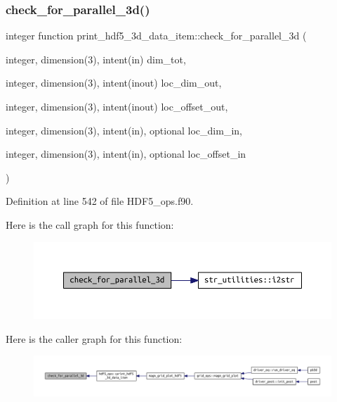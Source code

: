 \subsubsection{\texorpdfstring{check\+\_\+for\+\_\+parallel\+\_\+3d()}{check\_for\_parallel\_3d()}}
{\footnotesize\ttfamily integer function print\+\_\+hdf5\+\_\+3d\+\_\+data\+\_\+item\+::check\+\_\+for\+\_\+parallel\+\_\+3d (\begin{DoxyParamCaption}\item[{integer, dimension(3), intent(in)}]{dim\+\_\+tot,  }\item[{integer, dimension(3), intent(inout)}]{loc\+\_\+dim\+\_\+out,  }\item[{integer, dimension(3), intent(inout)}]{loc\+\_\+offset\+\_\+out,  }\item[{integer, dimension(3), intent(in), optional}]{loc\+\_\+dim\+\_\+in,  }\item[{integer, dimension(3), intent(in), optional}]{loc\+\_\+offset\+\_\+in }\end{DoxyParamCaption})}



Definition at line 542 of file H\+D\+F5\+\_\+ops.\+f90.

Here is the call graph for this function\+:
\nopagebreak
\begin{figure}[H]
\begin{center}
\leavevmode
\includegraphics[width=350pt]{HDF5__ops_8f90_a80c977815900dc90dfb63bc20a2abb5e_cgraph}
\end{center}
\end{figure}
Here is the caller graph for this function\+:
\nopagebreak
\begin{figure}[H]
\begin{center}
\leavevmode
\includegraphics[width=350pt]{HDF5__ops_8f90_a80c977815900dc90dfb63bc20a2abb5e_icgraph}
\end{center}
\end{figure}
\mbox{\label{HDF5__ops_8f90_a9ce89bbcdaf88002bfab4d531536c989}} 
